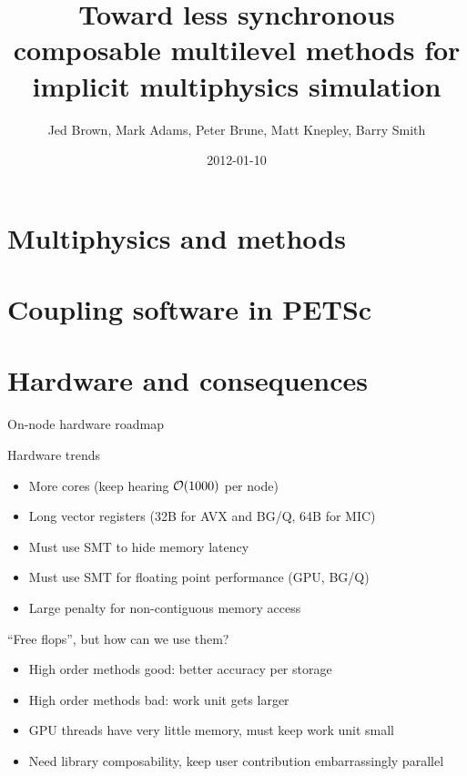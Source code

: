 \documentclass{beamer}
\title{Toward less synchronous composable multilevel methods for implicit multiphysics simulation}
\author{Jed Brown\inst{1}, Mark Adams\inst{2}, Peter Brune\inst{1}, Matt Knepley\inst{3}, Barry Smith\inst{1}}
\institute
{
  \inst{1}{Mathematics and Computer Science Division, Argonne National Laboratory} \\
  \inst{2}{Columbia University} \\
  \inst{3}{Computation Institute, University of Chicago}
}
\date{2012-01-10}
\begin{document}
\lstset{language=C}
\normalem

\begin{frame}
  \titlepage
\end{frame}

\section{Multiphysics and methods}




\section{Coupling software in PETSc}





\section{Hardware and consequences}
\begin{frame}{On-node hardware roadmap}
  \begin{block}{Hardware trends}
    \begin{itemize}
    \item More cores (keep hearing $\mathcal{O}(1000)$ per node)
    \item Long vector registers (32B for AVX and BG/Q, 64B for MIC)
    \item Must use SMT to hide memory latency
    \item Must use SMT for floating point performance (GPU, BG/Q)
    \item Large penalty for non-contiguous memory access
    \end{itemize}
  \end{block}
  \begin{block}{``Free flops'', but how can we use them?}
    \begin{itemize}
    \item High order methods good: better accuracy per storage
    \item High order methods bad: work unit gets larger
    \item GPU threads have very little memory, must keep work unit small
    \item Need library composability, keep user contribution embarrassingly parallel
    \end{itemize}
  \end{block}
\end{frame}
\end{document}
